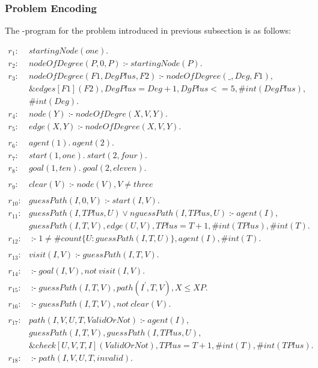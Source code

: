 \documentclass[14pt,a4paper, titlepage]{article}
\newcommand{\ext}[3]{\ensuremath{\&{#1}[#2](#3)}}
\DeclareMathOperator{\leftimpl}{:-}
\begin{document}
\subsubsection{Problem Encoding}
The \hex-program for the problem introduced in previous 
subsection is as follows:
\begin{exmp}
\label{pathfindingAgent}
\begin{align*}
r_1 \colon & startingNode(one). \\
r_2 \colon & nodeOfDegree(P,0,P) \leftimpl startingNode(P). 
\\
r_3 \colon & nodeOfDegree(F1, DegPlus, F2) \leftimpl 
nodeOfDegree(\_, Deg, F1), \\ & \ext{edges}{F1}{F2}, 
DegPlus=Deg+1, DgPlus <= 5, \#int(DegPlus), \\ &\#int(Deg). 
\\
r_4 \colon & node(Y) \leftimpl nodeOfDegre(X, V, Y).  \\
r_5 \colon & edge(X,Y) \leftimpl nodeOfDegree(X,V,Y).\\
\\
r_6 \colon &  \mathit{agent(1). } \ \mathit{ agent(2). }\\
r_7 \colon & \mathit{start(1,one).} \ \mathit{ 
start(2,four).} \\
r_8 \colon & \mathit{goal(1,ten).} \ \mathit{ 
goal(2,eleven).} \\
\\
r_9 \colon & clear(V) \leftimpl \mathit{node(V)}, V \neq 
\mathit{three}\\ 
\\
r_{10} \colon & guessPath(I,0,V) \leftimpl start(I,V). \\
r_{11} \colon &  \mathit{guessPath(I, TPlus, U)} \vee 
\mathit{nguessPath(I, TPlus, U)} \leftimpl 
\mathit{agent(I)}, \\ &  \mathit{guessPath(I, T, V)},  
\mathit{edge(U,V)}, \mathit{TPlus=T+1}, 
\mathit{\#int(TPlus)}, \mathit{\#int(T).}  \\
r_{12} \colon &  \leftimpl 1 \neq \mathit{\#count\{ U 
\colon guessPath(I, T, U) \}}, \mathit{agent(I)}, 
\mathit{\#int(T)}.  \\
\\
r_{13} \colon &  visit(I, V) \leftimpl guessPath(I,T,V). \\
\\
r_{14} \colon & \leftimpl goal(I, V), \mathit{not} \  
\mathit{visit(I, V).} \\
r_{15} \colon &  \leftimpl guessPath(I, T, V), 
path(I^{\prime},T,V), X \leq XP. \\
r_{16} \colon &  \leftimpl guessPath(I,T,V), \mathit{not} \  
\mathit{clear(V).}\\
\\
r_{17} \colon &  \mathit{path(I,V,U,T,ValidOrNot)} 
\leftimpl \mathit{agent(I)}, \\ & \mathit{guessPath(I, T, 
V)}, \mathit{guessPath(I, TPlus, U)}, \\ & \ext{check}{U, 
V, T, I}{ValidOrNot}, \mathit{TPlus=T+1}, \#int(T), 
\#int(TPlus).  \\
r_{18} \colon & \leftimpl path(I, V, U, T, invalid). 
\end{align*}
\end{exmp}
\end{document}
